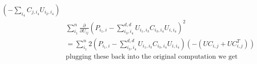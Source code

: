 \documentclass{report}
\begin{document}
\begin{align*}
   		 (-\sum_{i_4}C_{j,i_4}U_{i_2,i_4})\\  	
   		 &\sum_{i_1}^n\frac{\partial}{\partial U_{ij}}(P_{i_1,i} - \sum_{i_3,i_4}^{d,d}U_{i_1,i_3}C_{i_3,i_4}U_{i,i_4})^2\\
   		 &= \sum_{i_1}^n2(P_{i_1,i} - \sum_{i_3,i_4}^{d,d}U_{i_1,i_3}C_{i_3,i_4}U_{i,i_4})(-(UC_{i,j} + UC^T_{i,j}))\\  		
   		 &\text{plugging these back into the original computation we get}\\
   		 \end{align*}
\end{document}

